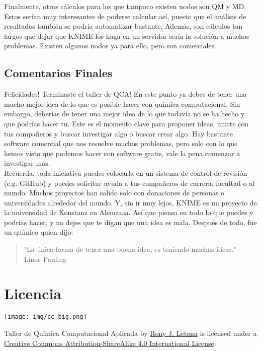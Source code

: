 \documentclass[10pt,letterpaper]{article}
\begin{document}
Finalmente, otros c\'alculos para los que tampoco existen nodos son QM y MD. Estos ser\'ian muy interesantes de poderse calcular as\'i, puesto que el an\'alisis de resultados tambi\'en se podr\'ia automatizar bastante. Adem\'as, son c\'alculos tan largos que dejar que KNIME los haga en un servidor ser\'ia la soluci\'on a muchos problemas. Existen algunos nodos ya para ello, pero son comerciales.

\subsection{Comentarios Finales}
Felicidades! Terminaste el taller de QCA! En este punto ya debes de tener una mucho mejor idea de lo que es posible hacer con qu\'imica computacional. Sin embargo, deber\'ias de tener una mejor idea de lo que todav\'ia no se ha hecho y que podr\'ias hacer tu. Este es el momento clave para proponer ideas, unirte con tus compa\~neros y buscar investigar algo o buscar crear algo. Hay bastante software comercial que nos resuelve muchos problemas, pero solo con lo que hemos visto que podemos hacer con software gratis, vale la pena comenzar a investigar m\'as.\\

Recuerda, toda iniciativa puedes colocarla en un sistema de control de revisi\'on (e.g. GitHub) y puedes solicitar ayuda a tus compa\~neros de carrera, facultad o al mundo. Muchos proyectos han salido solo con donaciones de personas o universidades alrededor del mundo. Y, sin ir muy lejos, KNIME es un proyecto de la universidad de Konstanz en Alemania. As\'i que piensa en todo lo que puedes y podr\'ias hacer, y no dejes que te digan que una idea es mala. Despu\'es de todo, fue un qu\'imico quien dijo:

\begin{flushright}
\begin{quote}
"La \'unica forma de tener una buena idea, es teniendo muchas ideas."\\
Linus Pauling
\end{quote}
\end{flushright}

\section*{Licencia}

\noindent \texttt{[image: img/cc\_big.png]}

\noindent Taller de Qu\'imica Computacional Aplicada by \href{http://github.com/zronyj/TQCA}{Rony J. Letona} is licensed under a \href{http://creativecommons.org/licenses/by-sa/4.0/}{Creative Commons Attribution-ShareAlike 4.0 International License}.
\end{document}
